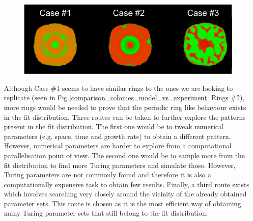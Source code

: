 \begin{figure}[H]
    \centering

    \includegraphics[width=1\textwidth]{chapters/Chapter 3/best_fit_colony_turing}
    \caption{ }
    \label{best_fit_colony_turing}
\end{figure} %

Although Case \#1 seems to have similar rings to the ones we are looking to replicate (seen in Fig.\ref{comparison_colonies_model_vs_experiment} Rings \#2), more rings would be needed to prove that the periodic ring like behaviour exists in the fit distribution.
Three routes can be taken to further explore the patterns present in the fit distribution.
The first one would be to tweak numerical parameters (e.g. space, time and growth rate) to obtain a different pattern.
However, numerical parameters are harder to explore from a computational parallelisation point of view.
The second one would be to sample more from the fit distribution to find more Turing parameters and simulate those.
However, Turing parameters are not commonly found and therefore it is also a computationally expensive task to obtain few results.
Finally, a third route exists which involves searching very closely around the vicinity of the already obtained parameter sets.
This route is chosen as it is the most efficient way of obtaining many Turing parameter sets that still belong to the fit distribution.

